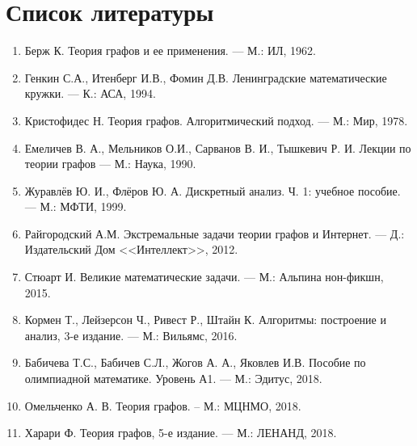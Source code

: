 \sloppy
\chapter*{Список литературы}
\begin{enumerate}
\item Берж К. Теория графов и ее применения. --- М.: ИЛ, 1962.
\item Генкин С.А., Итенберг И.В., Фомин Д.В. Ленинградские математические кружки. --- К.: АСА, 1994.
\item Кристофидес Н. Теория графов. Алгоритмический подход. --- М.: Мир, 1978.
\item Емеличев В. А., Мельников О.И., Сарванов В. И., Тышкевич Р. И. Лекции по теории графов --- М.: Наука, 1990.
\item Журавлёв Ю. И., Флёров Ю. А. Дискретный анализ. Ч. 1: учебное пособие. --- М.: МФТИ, 1999.
\item Райгородский А.М. Экстремальные задачи теории графов и Интернет. --- Д.: Издательский Дом <<Интеллект>>, 2012.
\item Стюарт И. Великие математические задачи. --- М.: Альпина нон-фикшн, 2015.
\item Кормен Т., Лейзерсон Ч., Ривест Р., Штайн К. Алгоритмы: построение и анализ, 3-е издание. --- М.: Вильямс, 2016.
\item Бабичева Т.С., Бабичев С.Л., Жогов А. А., Яковлев И.В. Пособие по олимпиадной математике. Уровень А1. --- М.: Эдитус, 2018.
\item Омельченко А. В. Теория графов. -- М.: МЦНМО, 2018.
\item Харари Ф. Теория графов, 5-е издание. --- М.: ЛЕНАНД, 2018.
\end{enumerate}


